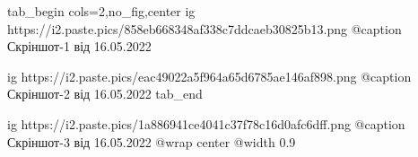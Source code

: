  
 
 
 
 

\ifcmt
  tab_begin cols=2,no_fig,center
  	 ig https://i2.paste.pics/858eb668348af338c7ddcaeb30825b13.png
	   @caption Скріншот-1 від 16.05.2022

		 ig https://i2.paste.pics/eac49022a5f964a65d6785ae146af898.png
		 @caption Скріншот-2 від 16.05.2022
  tab_end
\fi

\ifcmt
	ig https://i2.paste.pics/1a886941ce4041c37f78c16d0afc6dff.png
  @caption Скріншот-3 від 16.05.2022
  @wrap center
  @width 0.9
\fi

